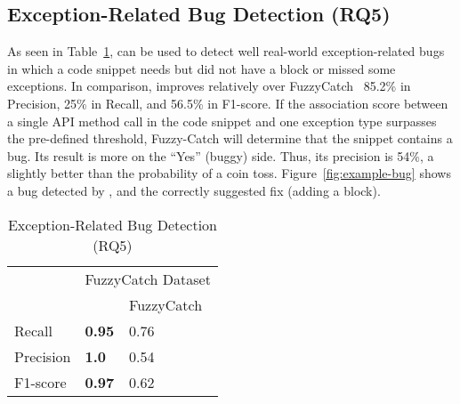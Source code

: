 \subsection{Exception-Related Bug Detection (RQ5)}
\label{sec:rq1}





As seen in Table~\ref{tab:bug}, {\tool} can be used to detect well
real-world exception-related bugs in which a code snippet needs but
did not have a  block or missed some exceptions. In
comparison, {\tool} improves relatively over
FuzzyCatch~\cite{xrank-fse20} 85.2\% in Precision, 25\% in Recall, and
56.5\% in F1-score.
%
If the association score between a single API method call in the code
snippet and one exception type surpasses the pre-defined threshold, Fuzzy-Catch
will determine that the snippet contains a bug.
Its result is more on the ``Yes'' (buggy) side. Thus, its precision is
54\%, a slightly better than the probability of a coin
toss. Figure~\ref{fig:example-bug} shows a bug detected by {\tool},
and the correctly suggested fix (adding a  block).


\begin{table}[t]%
  \caption {Exception-Related Bug Detection (RQ5)}
  \vspace{-12pt}
  \small
	\begin{center}
		\renewcommand{\arraystretch}{1}
		\begin{tabular}{|p{1.75cm}<{\centering}|p{1.75cm}<{\centering}|p{1.75cm}<{\centering}|}
		  \hline
			\multirow{2}{*}{} & \multicolumn{2}{c|}{FuzzyCatch Dataset} \\
			\cline{2-3}
			  & \tool  & FuzzyCatch~\cite{xrank-fse20} \\
			\hline
			Recall    & \textbf{0.95}& 0.76\\
			Precision & \textbf{1.0} & 0.54\\
			F1-score   & \textbf{0.97} & 0.62\\
			\hline
		\end{tabular}
		\label{tab:bug}
	\end{center}
\end{table}

%


